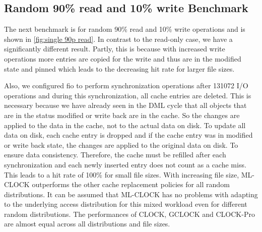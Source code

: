 \documentclass[
	12pt,
	a4paper,
	abstract,
	bibliography=totoc,
	chapterprefix,
	headings=openright,
	numbers=endperiod,
	parskip=half,
	twoside,
]{scrreprt}
\begin{document}
\newpage
\subsection{Random 90\% read and 10\% write Benchmark}

The next benchmark is for random 90\% read and 10\% write operations
and is shown in \cref{fig:single 90p read}.
In contrast to the read-only case, we have a significantly different result.
Partly, this is because with increased write operations more entries are copied for the write and thus are in the modified state and pinned
which leads to the decreasing hit rate for larger file sizes.

Also, we configured fio to perform synchronization operations after 131072 I/O operations and during this 
synchronization, all cache entries are deleted.
This is necessary because we have already seen in the DML cycle that all objects that are in the status 
modified or write back are in the cache.
So the changes are applied to the data in the cache, not to the actual data on disk.
To update all data on disk, each cache entry is dropped and if the cache entry was in modified or write back state,
the changes are applied to the original data on disk.
To ensure data consistency.
Therefore, the cache must be refilled after each synchronization and each newly inserted entry does not count as a cache miss.
This leads to a hit rate of 100\% for small file sizes.
With increasing file size, ML-CLOCK outperforms the other cache replacement policies for all random distributions.
It can be assumed that ML-CLOCK has no problems with adapting to the underlying access distribution for this mixed workload 
even for different random distributions.
The performances of CLOCK, GCLOCK and CLOCK-Pro are almost equal across all distributions and file sizes.
\end{document}
